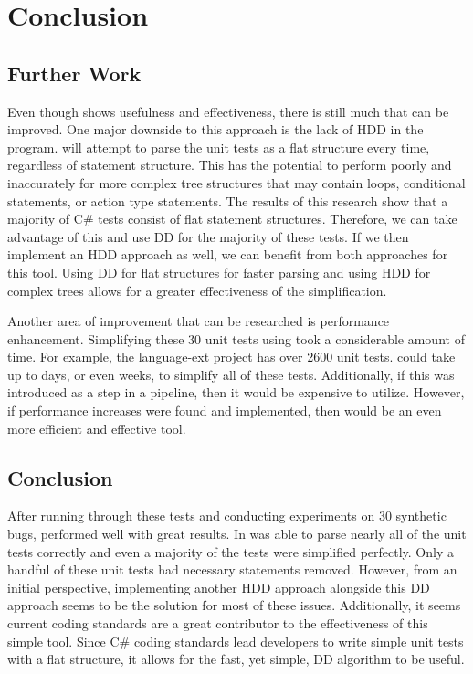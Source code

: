 \clearpage %

\chapter{Conclusion}\label{CH7_Conclusion}

\section{Further Work}

Even though \mytool shows usefulness and effectiveness, there is still much that can be improved. One major downside to this approach is the lack of HDD in the program. \mytool will attempt to parse the unit tests as a flat structure every time, regardless of statement structure. This has the potential to perform poorly and inaccurately for more complex tree structures that may contain loops, conditional statements, or action type statements. The results of this research show that a majority of C\# tests consist of flat statement structures. Therefore, we can take advantage of this and use DD for the majority of these tests. If we then implement an HDD approach as well, we can benefit from both approaches for this tool. Using DD for flat structures for faster parsing and using HDD for complex trees allows for a greater effectiveness of the simplification. 

Another area of improvement that can be researched is performance enhancement. Simplifying these 30 unit tests using \mytool took a considerable amount of time. For example, the language-ext project has over 2600 unit tests. \mytool could take up to days, or even weeks, to simplify all of these tests. Additionally, if this was introduced as a step in a pipeline, then it would be expensive to utilize. However, if performance increases were found and implemented, then \mytool would be an even more efficient and effective tool.

\section{Conclusion}

After running through these tests and conducting experiments on 30 synthetic bugs, \mytool performed well with great results. In was able to parse nearly all of the unit tests correctly and even a majority of the tests were simplified perfectly. Only a handful of these unit tests had necessary statements removed. However, from an initial perspective, implementing another HDD approach alongside this DD approach seems to be the solution for most of these issues. Additionally, it seems current coding standards are a great contributor to the effectiveness of this simple tool. Since C\# coding standards lead developers to write simple unit tests with a flat structure, it allows for the fast, yet simple, DD algorithm to be useful.